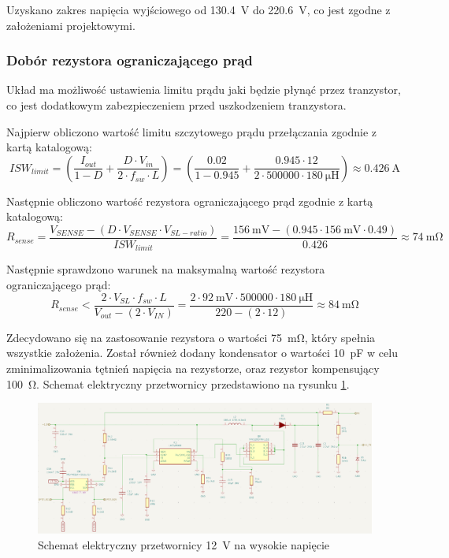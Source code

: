 \documentclass[../../main.tex]{subfiles}
\begin{document}
Uzyskano zakres napięcia wyjściowego od \SI{130.4}{\volt} do \SI{220.6}{\volt}, co jest zgodne z założeniami projektowymi.

\subsubsection{Dobór rezystora ograniczającego prąd}
Układ ma możliwość ustawienia limitu prądu jaki będzie płynąć przez tranzystor,
co jest dodatkowym zabezpieczeniem przed uszkodzeniem tranzystora.

Najpierw obliczono wartość limitu szczytowego prądu przełączania zgodnie z kartą katalogową:
\begin{equation}
    ISW_{limit} = \left(\frac{I_{out}}{1-D}+\frac{D \cdot V_{in}}{2 \cdot f_{sw} \cdot L}\right) = \left(\frac{0.02}{1-0.945}+\frac{0.945 \cdot 12}{2 \cdot 500000 \cdot \SI{180}{\micro\henry}}\right) \approx \SI{0.426}{\ampere}
\end{equation}

Następnie obliczono wartość rezystora ograniczającego prąd zgodnie z kartą katalogową:
\begin{equation}
    R_{sense} = \frac{V_{SENSE} - (D \cdot V_{SENSE} \cdot V_{SL-ratio})}{ISW_{limit}} = \frac{\SI{156}{\milli\volt} - (0.945 \cdot \SI{156}{\milli\volt} \cdot 0.49)}{0.426} \approx \SI{74}{\milli\ohm}
\end{equation}

Następnie sprawdzono warunek na maksymalną wartość rezystora ograniczającego prąd:
\begin{equation}
    R_{sense} < \frac{2 \cdot V_{SL} \cdot f_{sw} \cdot L}{V_{out} - (2 \cdot V_{IN})} = \frac{2 \cdot \SI{92}{\milli\volt} \cdot 500000 \cdot \SI{180}{\micro\henry}}{220 - (2 \cdot 12)} \approx \SI{84}{\milli\ohm}
\end{equation}

Zdecydowano się na zastosowanie rezystora o wartości \SI{75}{\milli\ohm}, który spełnia wszystkie założenia.
Został również dodany kondensator o wartości \SI{10}{\pico\farad} w celu zminimalizowania tętnień napięcia na rezystorze,
oraz rezystor kompensujący \SI{100}{\ohm}. Schemat elektryczny przetwornicy przedstawiono na rysunku \ref{fig:schemat}.
\begin{figure}[H]
    \centering
    \includegraphics[width=1\textwidth]{schemat.png}
    \caption{Schemat elektryczny przetwornicy \SI{12}{\volt} na wysokie napięcie}
    \label{fig:schemat}
\end{figure}
\end{document}
